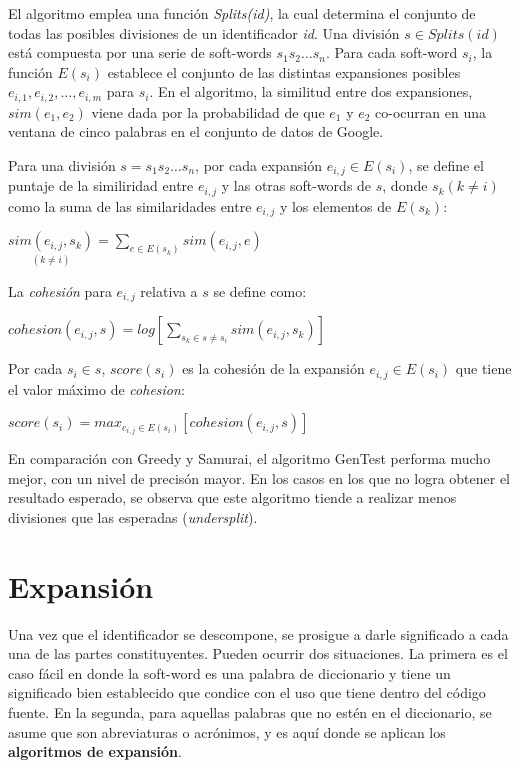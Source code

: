 El algoritmo emplea una función \textit{Splits(id)}, la cual determina el conjunto de todas las posibles divisiones de un identificador \textit{id}.
Una división $s \in Splits(id)$ está compuesta por una serie de soft-words $s_1 s_2 \dots s_n$.
Para cada soft-word $s_i$, la función $E(s_i)$ establece el conjunto de las distintas expansiones posibles $e_{i,1}, e_{i,2}, \dots, e_{i,m}$ para $s_i$.
En el algoritmo, la similitud entre dos expansiones, $sim(e_1, e_2)$ viene dada por la probabilidad de que $e_1$ y $e_2$ co-ocurran en una ventana de cinco palabras en el conjunto de datos de Google.

Para una división $s = s_1 s_2 \dots s_n$, por cada expansión $e_{i,j} \in E(s_i)$, se define el puntaje de la similiridad entre $e_{i,j}$ y las otras soft-words de $s$, donde $s_k (k \neq i)$ como la suma de las similaridades entre $e_{i,j}$ y los elementos de $E(s_k)$:

\begin{center}
  $\underset{(k \neq i)}{sim(e_{i,j}, s_k)} = \displaystyle\sum_{e \in E(s_k)} sim(e_{i,j}, e)$
\end{center}

La \textit{cohesión} para $e_{i,j}$ relativa a $s$ se define como:

\begin{center}
  $cohesion(e_{i,j}, s) = log \displaystyle [\sum_{s_k \in s \neq s_i} sim(e_{i,j}, s_k)]$
\end{center}

Por cada $s_i \in s$, $score(s_i)$ es la cohesión de la expansión $e_{i,j} \in E(s_i)$ que tiene el valor máximo de \textit{cohesion}:

\begin{center}
  $score(s_i) = max_{e_{i,j} \in E(s_i)} [cohesion(e_{i,j}, s)]$
\end{center}

En comparación con Greedy y Samurai, el algoritmo GenTest performa mucho mejor, con un nivel de precisón mayor.
En los casos en los que no logra obtener el resultado esperado, se observa que este algoritmo tiende a realizar menos divisiones que las esperadas (\textit{undersplit}).

\section{Expansión}
Una vez que el identificador se descompone, se prosigue a darle significado a cada una de las partes constituyentes.
Pueden ocurrir dos situaciones.
La primera es el caso fácil en donde la soft-word es una palabra de diccionario y tiene un significado bien establecido que condice con el uso que tiene dentro del código fuente.
En la segunda, para aquellas palabras que no estén en el diccionario, se asume que son abreviaturas o acrónimos, y es aquí donde se aplican los \textbf{algoritmos de expansión}.

